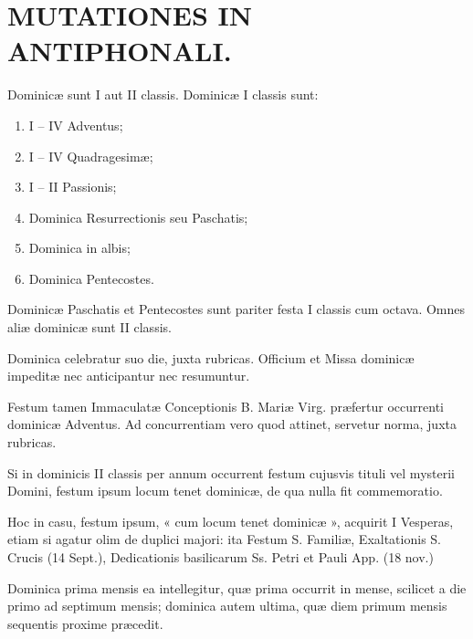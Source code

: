 \documentclass[vesperale_romanum.tex]{subfiles}
\begin{document}
\chapter*{MUTATIONES IN ANTIPHONALI.}



Dominicæ sunt I aut II classis. Dominicæ I classis sunt:

\begin{enumerate}[nosep,label=\alph*.]
\item I – IV Adventus;
\item I – IV Quadragesimæ;
\item I – II Passionis;
\item  Dominica Resurrectionis seu Paschatis;
\item Dominica in albis;
\item Dominica Pentecostes. %
\end{enumerate}

Dominicæ Paschatis et Pentecostes sunt pariter festa I classis cum octava. Omnes aliæ dominicæ sunt II classis.

Dominica celebratur suo die, juxta rubricas. Officium et Missa dominicæ impeditæ nec anticipantur nec resumuntur.

Festum tamen Immaculatæ Conceptionis B. Mariæ Virg. præfertur occurrenti dominicæ Adventus.
Ad concurrentiam vero quod attinet, servetur norma, juxta rubricas.

Si in dominicis II classis per annum occurrent festum cujusvis tituli vel mysterii Domini, festum i\-psum locum tenet dominicæ, de qua nulla fit commemoratio.

Hoc in casu, festum i\-psum, « cum locum tenet dominicæ », acquirit I Vesperas, etiam si agatur olim de duplici majori: ita Festum S. Familiæ, Exaltationis S. Crucis (14 Sept.), Dedicationis basilicarum Ss. Petri et Pauli App. (18 nov.) %

Dominica prima mensis ea intellegitur, quæ prima occurrit in mense, scilicet a die primo ad septimum mensis; dominica autem ultima, quæ diem primum mensis sequentis proxime præcedit.
\end{document}
